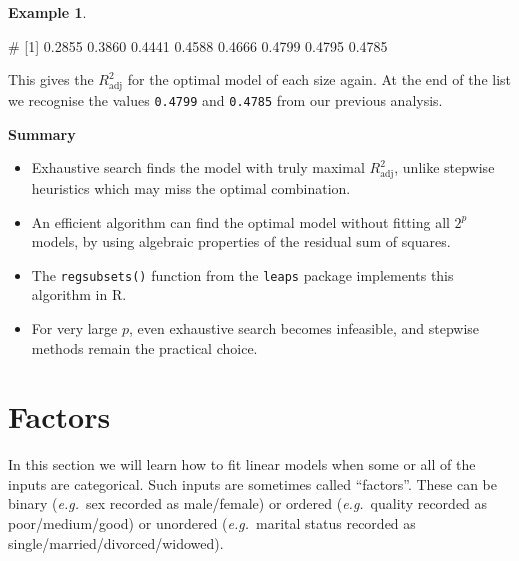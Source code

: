 \documentclass[
  a4paper,
]{article}
\newenvironment{Shaded}{\begin{snugshade}}{\end{snugshade}}
\newcommand{\DecValTok}[1]{\textcolor[rgb]{0.00,0.00,0.81}{#1}}
\newcommand{\FunctionTok}[1]{\textcolor[rgb]{0.13,0.29,0.53}{\textbf{#1}}}
\newcommand{\NormalTok}[1]{#1}
\newcommand{\SpecialCharTok}[1]{\textcolor[rgb]{0.81,0.36,0.00}{\textbf{#1}}}
\providecommand{\tightlist}{%
  \setlength{\itemsep}{0pt}\setlength{\parskip}{0pt}}
\theoremstyle{definition}
\theoremstyle{definition}
\newtheorem{example}{Example}[section]
\theoremstyle{definition}
\theoremstyle{definition}
\theoremstyle{remark}
\begin{document}
\begin{example}
\begin{Shaded}
\end{Shaded}

\begin{Shaded}
\begin{Highlighting}[]
\NormalTok{\# [1] 0.2855 0.3860 0.4441 0.4588 0.4666 0.4799 0.4795 0.4785}
\end{Highlighting}
\end{Shaded}

This gives the \(R^2_\mathrm{adj}\) for the optimal model of each size
again. At the end of the list we recognise the values \texttt{0.4799} and
\texttt{0.4785} from our previous analysis.
\end{example}

\textbf{Summary}

\begin{itemize}
\tightlist
\item
  Exhaustive search finds the model with truly maximal \(R^2_\mathrm{adj}\),
  unlike stepwise heuristics which may miss the optimal combination.
\item
  An efficient algorithm can find the optimal model without fitting all
  \(2^p\) models, by using algebraic properties of the residual sum of squares.
\item
  The \texttt{regsubsets()} function from the \texttt{leaps} package implements this
  algorithm in R.
\item
  For very large \(p\), even exhaustive search becomes infeasible, and
  stepwise methods remain the practical choice.
\end{itemize}

\clearpage

\section{Factors}\label{S14-factors}

In this section we will learn how to fit linear models when some or all
of the inputs are categorical. Such inputs are sometimes called ``factors''.
These can be
binary (\emph{e.g.}~sex recorded as male/female)
or ordered (\emph{e.g.}~quality recorded as poor/medium/good)
or unordered (\emph{e.g.}~marital status recorded as single/married/divorced/widowed).
\end{document}
